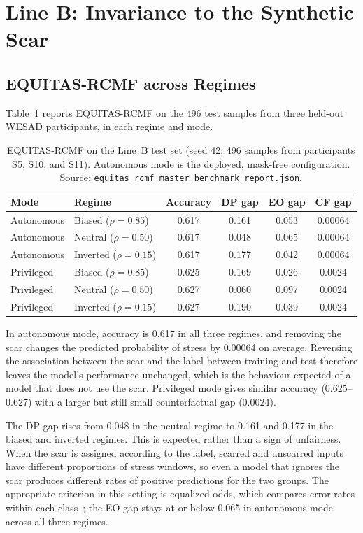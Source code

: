 \section{Line B: Invariance to the Synthetic Scar}
\subsection{EQUITAS-RCMF across Regimes}
Table~\ref{tab:regimes} reports EQUITAS-RCMF on the 496 test samples from three held-out WESAD participants, in each regime and mode.

\begin{table}[htbp]
\centering
\begin{tabular}{@{}llcccc@{}}
\toprule
\textbf{Mode} & \textbf{Regime} & \textbf{Accuracy} & \textbf{DP gap} & \textbf{EO gap} & \textbf{CF gap} \\
\midrule
Autonomous & Biased ($\rho = 0.85$) & 0.617 & 0.161 & 0.053 & 0.00064 \\
Autonomous & Neutral ($\rho = 0.50$) & 0.617 & 0.048 & 0.065 & 0.00064 \\
Autonomous & Inverted ($\rho = 0.15$) & 0.617 & 0.177 & 0.042 & 0.00064 \\
\midrule
Privileged & Biased ($\rho = 0.85$) & 0.625 & 0.169 & 0.026 & 0.0024 \\
Privileged & Neutral ($\rho = 0.50$) & 0.627 & 0.060 & 0.097 & 0.0024 \\
Privileged & Inverted ($\rho = 0.15$) & 0.627 & 0.190 & 0.039 & 0.0024 \\
\bottomrule
\end{tabular}
\caption{EQUITAS-RCMF on the Line~B test set (seed 42; 496 samples from participants S5, S10, and S11). Autonomous mode is the deployed, mask-free configuration. Source: \texttt{equitas\_rcmf\_master\_benchmark\_report.json}.}
\label{tab:regimes}
\end{table}

In autonomous mode, accuracy is 0.617 in all three regimes, and removing the scar changes the predicted probability of stress by 0.00064 on average. Reversing the association between the scar and the label between training and test therefore leaves the model's performance unchanged, which is the behaviour expected of a model that does not use the scar. Privileged mode gives similar accuracy (0.625--0.627) with a larger but still small counterfactual gap (0.0024).

The DP gap rises from 0.048 in the neutral regime to 0.161 and 0.177 in the biased and inverted regimes. This is expected rather than a sign of unfairness. When the scar is assigned according to the label, scarred and unscarred inputs have different proportions of stress windows, so even a model that ignores the scar produces different rates of positive predictions for the two groups. The appropriate criterion in this setting is equalized odds, which compares error rates within each class~\cite{anthis2023}; the EO gap stays at or below 0.065 in autonomous mode across all three regimes.

